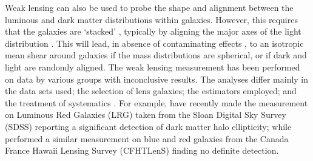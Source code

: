 \documentclass[useAMS,usenatbib]{mn2e}
\begin{document}
Weak lensing can also be used to probe the shape and alignment between the luminous and dark matter distributions within galaxies. However, this requires that the galaxies are `stacked' \citep{2000astro.ph..6281B,2000ApJ...538L.113N}, typically by aligning the major axes of the light distribution \citep[e.g.][]{2004ApJ...606...67H}. This will lead, in absence of contaminating effects \citep[e.g. intrinsic alignments;][]{2004PhRvD..70f3526H}, to an isotropic mean shear around galaxies if the mass distributions are spherical, or if dark and light are randomly aligned. The weak lensing measurement has been performed on data by various groups \citep[][]{2004ApJ...606...67H,2006MNRAS.370.1008M,2007ApJ...669...21P,2012A&A...545A..71V} with inconclusive results. The analyses differ mainly in the data sets used; the selection of lens galaxies; the estimators employed; and the treatment of systematics \citep[see e.g.][]{2015arXiv150704301S}. For example, \citet{2015arXiv150603536C} have recently made the measurement on Luminous Red Galaxies (LRG) taken from the Sloan Digital Sky Survey (SDSS) reporting a significant detection of dark matter halo ellipticity; while \citet{2015arXiv150704301S} performed a similar measurement on blue and red galaxies from the Canada France Hawaii Lensing Survey (CFHTLenS) finding no definite detection. %


\end{document}
